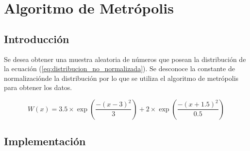 \documentclass{article}
\begin{document}
\section{Algoritmo de Metrópolis}

\subsection{Introducción}

Se desea obtener una muestra aleatoria de números que posean la distribución de la ecuación (\ref{eq:distribucion_no_normalizada}). Se desconoce la constante de normalizaciónde la distribución por lo que se utiliza el algoritmo de metrópolis para obtener los datos.

\begin{equation}
  W(x) = 3.5 \times \exp\left({\frac{-(x-3)^2}{3}}\right) + 2 \times \exp{\left(\frac{-(x+1.5)^2}{0.5}\right)}
  \label{eq:distribucion_no_normalizada}
\end{equation}

\subsection{Implementación}
\end{document}
